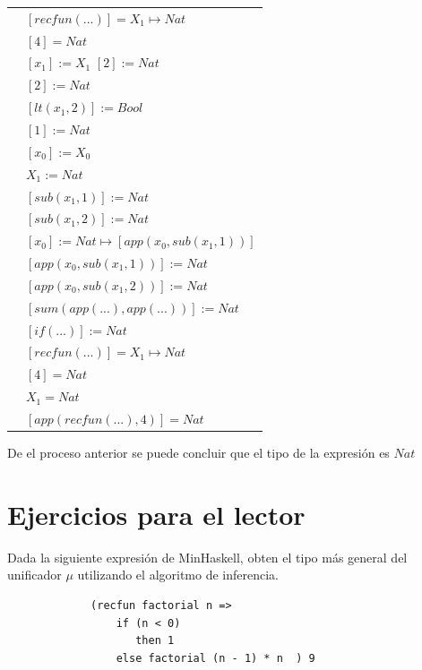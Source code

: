 \begin{exercise}
\begin{description}
\begin{center}
\begin{longtable}{ | l | l | }
                        & $[recfun(...)] = X_1 \mapsto Nat$ \\
                        & $[4] = Nat$ \\
                    \hline
                        & $[x_1] := X_1$ $[2] := Nat$ \\
                        & $[2] := Nat$ \\
                        & $[lt(x_1 , 2)] := Bool$ \\
                        & $[1] := Nat$ \\
                        & $[x_0] := X_0$ \\
                        & $X_1 := Nat$ \\
                        & $[sub(x_1,1)] := Nat$ \\
                        & $[sub(x_1,2)] := Nat$ \\
                        & $[x_0] := Nat \mapsto [app(x_0, sub(x_1,1))]$ \\
                        & $[app(x_0, sub(x_1,1))] := Nat$ \\
                        & $[app(x_0, sub(x_1,2))] := Nat$ \\
                        & $[sum(app(...), app(...))] := Nat$ \\
                        & $[if(...)] := Nat $ \\
                        & $[recfun(...)] = X_1 \mapsto Nat$  \\
                        & $[4] = Nat $ \\
                        & $X_1 = Nat $\\
                        & $[app(recfun(...), 4)] = Nat$ \\
                    \hline
                \end{longtable}
            \end{center}
        \end{description}
            De el proceso anterior se puede concluir que el tipo de la expresión es $Nat$
    \end{exercise}
    
    \section{Ejercicios para el lector}

     \begin{exercise} Dada la siguiente expresión de MinHaskell, obten el tipo más general del unificador $\mu$ utilizando el algoritmo de inferencia.
          \begin{lstlisting}
             (recfun factorial n => 
                 if (n < 0) 
                    then 1
                 else factorial (n - 1) * n  ) 9
           \end{lstlisting}
     \end{exercise}

